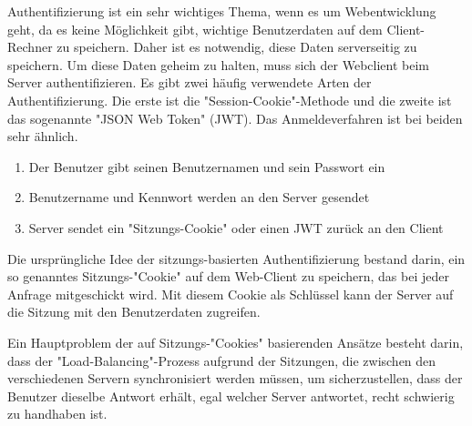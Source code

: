 

Authentifizierung ist ein sehr wichtiges Thema, wenn es um Webentwicklung geht, da es keine Möglichkeit gibt, wichtige Benutzerdaten auf dem Client-Rechner zu speichern. Daher ist es notwendig, diese Daten serverseitig zu speichern. Um diese Daten geheim zu halten, muss sich der Webclient beim Server authentifizieren. Es gibt zwei häufig verwendete Arten der Authentifizierung. Die erste ist die "Session-Cookie"-Methode und die zweite ist das sogenannte "JSON Web Token" (JWT). Das Anmeldeverfahren ist bei beiden sehr ähnlich. 

\begin{enumerate}
    \item Der Benutzer gibt seinen Benutzernamen und sein Passwort ein
    \item Benutzername und Kennwort werden an den Server gesendet
    \item Server sendet ein "Sitzungs-Cookie" oder einen JWT zurück an den Client
\end{enumerate}


Die ursprüngliche Idee der sitzungs-basierten Authentifizierung bestand darin, ein so genanntes Sitzungs-"Cookie" auf dem Web-Client zu speichern, das bei jeder Anfrage mitgeschickt wird. Mit diesem Cookie als Schlüssel kann der Server auf die Sitzung mit den Benutzerdaten zugreifen. 

Ein Hauptproblem der auf Sitzungs-"Cookies" basierenden Ansätze besteht darin, dass der "Load-Balancing"-Prozess aufgrund der Sitzungen, die zwischen den verschiedenen Servern synchronisiert werden müssen, um sicherzustellen, dass der Benutzer dieselbe Antwort erhält, egal welcher Server antwortet, recht schwierig zu handhaben ist.



\pagebreak


